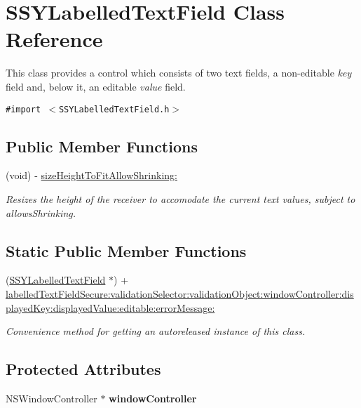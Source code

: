 \hypertarget{interface_s_s_y_labelled_text_field}{
\section{SSYLabelledTextField Class Reference}
\label{interface_s_s_y_labelled_text_field}
}
This class provides a control which consists of two text fields, a non-editable {\em key\/} field and, below it, an editable {\em value\/} field.  


{\tt \#import $<$SSYLabelledTextField.h$>$}

\subsection*{Public Member Functions}
\begin{CompactItemize}
\item 
(void) - \hyperlink{interface_s_s_y_labelled_text_field_87d5c2cae146575b5546c12207e4aa93}{sizeHeightToFitAllowShrinking:}
\begin{CompactList}\small\item\em Resizes the height of the receiver to accomodate the current text values, subject to allowsShrinking. \item\end{CompactList}\end{CompactItemize}
\subsection*{Static Public Member Functions}
\begin{CompactItemize}
\item 
(\hyperlink{interface_s_s_y_labelled_text_field}{SSYLabelledTextField} $\ast$) + \hyperlink{interface_s_s_y_labelled_text_field_771e047022ab3abff4b688d29de85089}{labelledTextFieldSecure:validationSelector:validationObject:windowController:displayedKey:displayedValue:editable:errorMessage:}
\begin{CompactList}\small\item\em Convenience method for getting an autoreleased instance of this class. \item\end{CompactList}\end{CompactItemize}
\subsection*{Protected Attributes}
\begin{CompactItemize}
\item 
\hypertarget{interface_s_s_y_labelled_text_field_826e43a34e383f6cbdb6461428f4cc09}{
NSWindowController $\ast$ \textbf{windowController}}
\label{interface_s_s_y_labelled_text_field_826e43a34e383f6cbdb6461428f4cc09}

\end{CompactItemize}
